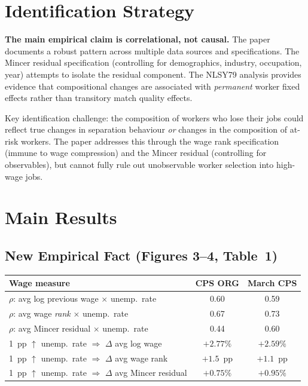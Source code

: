 \section{Identification Strategy}

\textbf{The main empirical claim is correlational, not causal.} The paper
documents a robust pattern across multiple data sources and specifications.
The Mincer residual specification (controlling for demographics, industry,
occupation, year) attempts to isolate the residual component. The NLSY79
analysis provides evidence that compositional changes are associated with
\emph{permanent} worker fixed effects rather than transitory match quality
effects.

Key identification challenge: the composition of workers who lose their jobs
could reflect true changes in separation behaviour \emph{or} changes in the
composition of at-risk workers. The paper addresses this through the wage rank
specification (immune to wage compression) and the Mincer residual (controlling
for observables), but cannot fully rule out unobservable worker selection into
high-wage jobs.

\section{Main Results}

\subsection*{New Empirical Fact (Figures 3--4, Table~1)}

\begin{center}
\begin{tabular}{lcc}
\toprule
\textbf{Wage measure} & \textbf{CPS ORG} & \textbf{March CPS} \\
\midrule
$\rho$: avg log previous wage $\times$ unemp.\ rate & 0.60 & 0.59 \\
$\rho$: avg wage \emph{rank} $\times$ unemp.\ rate & 0.67 & 0.73 \\
$\rho$: avg Mincer residual $\times$ unemp.\ rate & 0.44 & 0.60 \\
\midrule
1~pp $\uparrow$ unemp.\ rate $\Rightarrow$ $\Delta$ avg log wage & $+2.77\%$ & $+2.59\%$ \\
1~pp $\uparrow$ unemp.\ rate $\Rightarrow$ $\Delta$ avg wage rank & $+1.5$~pp & $+1.1$~pp \\
1~pp $\uparrow$ unemp.\ rate $\Rightarrow$ $\Delta$ avg Mincer residual & $+0.75\%$ & $+0.95\%$ \\
\bottomrule
\end{tabular}
\end{center}

